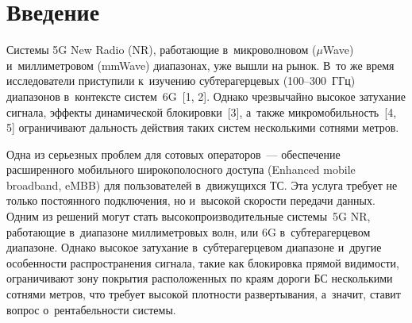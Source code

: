   
  



\thispagestyle{headings}

\begin{multicols}{2}

\label{st\stat}

\section{Введение}



     Системы 5G New Radio (NR), \mbox{ра\-бо\-та\-ющие} в~мик\-ро\-вол\-но\-вом 
($\mu$Wave) и~миллиметровом (mmWave) диапазонах, уже вышли на рынок. 
В~то же время исследователи приступили к~изучению субтерагерцевых  
(100--300~ГГц) диапазонов в~контексте сис\-тем~6G~[1, 2]. Однако 
чрезвычайно высокое затухание сигнала, эффекты динамической 
блокировки~[3], а~также микромобильность~[4, 5] ограничивают дальность 
действия таких систем несколькими сотнями метров.
     
     Одна из серьезных проблем для сотовых операторов~--- обеспечение 
расширенного мобильного широкополосного доступа (Enhanced mobile 
broadband, eMBB) для пользователей в~движущихся ТС.\linebreak
 Эта услуга требует не только постоянного подключения, но и~высокой 
ско\-рости передачи данных. Одним из решений могут стать 
высокопроизводительные сис\-те\-мы~5G NR, работающие в~\mbox{диапазоне} 
миллиметровых волн, или 6G в~субтерагерцевом диапазоне. Однако высокое 
затухание в~субтерагерцевом диапазоне и~другие особенности 
распространения сигнала, такие как блокировка прямой видимости, 
ограничивают зону покрытия расположенных по краям дороги БС 
несколькими сотнями метров, что требует высокой плотности развертывания, 
а~значит, ставит вопрос о~рен\-та\-бель\-ности сис\-темы.

\begin{figure*}[b] %
\vspace*{-4pt}
\begin{center}
   \mbox{%
\epsfxsize=163mm
}
\end{center}
\vspace*{-9pt}
\end{figure*}


\end{multicols}
